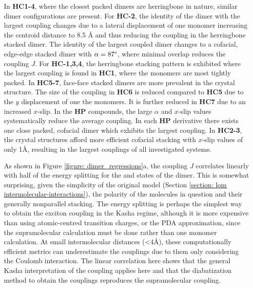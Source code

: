 In \textbf{HC1-4}, where the closest packed dimers are herringbone in nature, similar dimer configurations are present. For \textbf{HC-2}, the identity of the dimer with the largest coupling changes due to a lateral displacement of one monomer increasing the centroid distance to 8.5 {\AA} and thus reducing the coupling in the herringbone stacked dimer. The identity of the largest coupled dimer changes to a cofacial, edge-edge stacked dimer with $\alpha=87\degree$, where minimal overlap reduces the coupling $J$. For \textbf{HC-1,3,4}, the herringbone stacking pattern is exhibited where the largest coupling is found in \textbf{HC1}, where the monomers are most tightly packed. In \textbf{HC5-7}, face-face stacked dimers are more prevalent in the crystal structure. The size of the coupling in \textbf{HC6} is reduced compared to \textbf{HC5} due to the $y$ displacement of one the monomers. It is further reduced in \textbf{HC7} due to an increased $x$-slip. In the \textbf{HP} compounds, the large $\alpha$ and $x$-slip values systematically reduce the average coupling. In each \textbf{HP} derivative there exists one close packed, cofacial dimer which exhibits the largest coupling. In \textbf{HC2-3}, the crystal structures afford more efficient cofacial stacking with $x$-slip values of only 1{\AA}, resulting in the largest couplings of all investigated systems. 

As shown in  Figure \ref{figure: dimer_regressions}a, the coupling $J$ correlates linearly with half of the energy splitting for the \sone{} and \stwo{} states of the dimer. This is somewhat surprising, given the simplicity of the original model (Section \ref{section: lom intermolecular-interactions}), the polarity of the molecules in question and their generally nonparallel stacking. The energy splitting is perhaps the simplest way to obtain the exciton coupling in the Kasha regime, although it is more expensive than using atomic-centred transition charges, or the PDA approximation, since the supramolecular calculation must be done rather than one monomer calculation. At small intermolecular distances (\textless4{\AA}), these computationally efficient metrics can underestimate the couplings due to them only considering the Coulomb interaction.\cite{Kistler2013} The linear correlation here shows that the general Kasha interpretation of the coupling applies here and that the diabatization method to obtain the couplings reproduces the supramolecular coupling.

